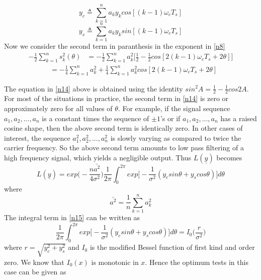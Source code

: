 \documentclass[a4paper,english,12pt]{article}
\begin{document}
\begin{equation*}
y_c \triangleq \sum_{k=1}^{n}a_k y_k cos[(k-1)\omega_c T_s]
\end{equation*}
\begin{equation*}
y_s \triangleq \sum_{k=1}^{n}a_k y_k sin[(k-1)\omega_c T_s]
\end{equation*}
Now we consider the second term in paranthesis in the exponent in \eqref{n8}
\begin{align*}
-\frac{1}{2}\sum_{k=1}^{n}s_k^2(\theta) &= -\frac{1}{2}\sum_{k=1}^{n}a_k^2\bigg[\frac{1}{2}-\frac{1}{2}cos[2(k-1)\omega_c T_s+2\theta]\bigg] 
\end{align*}
\begin{align}
 \label{n14}
&=-\frac{1}{4}\sum_{k=1}^{n}a_k^2+\frac{1}{4}\sum_{k=1}^{n}a_k^2 cos[2(k-1)\omega_c T_s+2\theta]
\end{align}
\par The equation in \eqref{n14} above is obtained using the identity $sin^2A= \frac{1}{2}-\frac{1}{2}cos2A$.
For most of the situations in practice, the second term in \eqref{n14} is zero or approximately zero for all values of $\theta$. For example, if the signal sequence $a_1,a_2,...,a_n$ is a constant times the sequence of $\pm1$'s or if $a_1,a_2,...,a_n$ has a raised cosine shape, then the above second term is identically zero. In other cases of interest, the sequence $a_1^2,a_2^2,...,a_n^2$ is slowly varying as compared to twice the carrier frequency. So the above second term amounts to low pass filtering of a high frequency signal, which yields a negligible output. Thus $L(\underline{y})$ becomes
\begin{equation}
 \label{n15}
L(\underline{y})=exp\bigg(-\frac{n\bar{a^2}}{4\sigma^2}\bigg)  \frac{1}{2\pi}\int_{0}^{2\pi}exp\bigg[-\frac{1}{\sigma^2}( y_c sin\theta +y_s cos\theta)\bigg]d\theta
\end{equation}
where
\begin{equation}
 \label{n16}
\bar{a^2}=\frac{1}{n}\sum_{k=1}^{n}a_k^2
\end{equation}
The integral term in \eqref{n15} can be written as
\begin{equation}
 \label{n17}
\frac{1}{2\pi}\int_{0}^{2\pi}exp\bigg[-\frac{1}{\sigma^2}( y_c sin\theta +y_s cos\theta)\bigg]d\theta= I_0\bigg(\frac{r}{\sigma^2}\bigg)
\end{equation}
where $r=\sqrt{y_c^2+y_s^2}$ and $I_0$ is the modified Bessel function of first kind and order zero. We know that $I_0(x)$ is monotonic in $x$. Hence the optimum tests in this case can be given as
\end{document}
